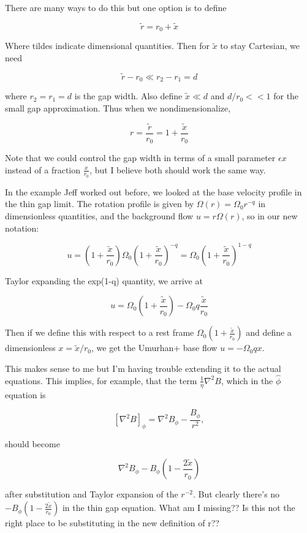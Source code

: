 \documentclass{paper}
\newcommand{\beq}{\begin{equation}}
\newcommand{\eeq}{\end{equation}}
\begin{document}
There are many ways to do this but one option is to define 

\beq
\widetilde{r} = r_0 + \widetilde{x}
\eeq 

Where tildes indicate dimensional quantities. Then for $\widetilde{x}$ to stay Cartesian, we need

\beq
\widetilde{r} - r_0 \ll r_2 - r_1 = d
\eeq

where $r_2 = r_1 = d$ is the gap width. Also define $\widetilde{x} \ll d$ and $d/r_0 << 1$ for the small gap approximation. Thus when we nondimensionalize,

\beq
r = \frac{\widetilde{r}}{r_0} = 1 + \frac{\widetilde{x}}{r_0}
\eeq

Note that we could control the gap width in terms of a small parameter $\epsilon x$ instead of a fraction $\frac{x}{r_0}$, but I believe both should work the same way.

In the example Jeff worked out before, we looked at the base velocity profile in the thin gap limit. The rotation profile is given by $\Omega(r) = \Omega_0 r^{-q}$ in dimensionless quantities, and the background flow $u = r\Omega(r)$, so in our new notation:

\beq
u = \left(1 + \frac{\widetilde{x}}{r_0}\right) \Omega_0 \left(1 + \frac{\widetilde{x}}{r_0}\right)^{-q} = \Omega_0 \left(1 + \frac{\widetilde{x}}{r_0}\right)^{1-q}  
\eeq

Taylor expanding the exp(1-q) quantity, we arrive at

\beq
u = \Omega_0 \left(1 + \frac{\widetilde{x}}{r_0}\right) - \Omega_0 q \frac{\widetilde{x}}{r_0}
\eeq

Then if we define this with respect to a rest frame $\Omega_0 \left(1 + \frac{\widetilde{x}}{r_0}\right)$ and define a dimensionless $x = \widetilde{x}/r_0$, we get the Umurhan+ base flow $u = - \Omega_0 q x$. 

This makes sense to me but I'm having trouble extending it to the actual equations. This implies, for example, that the term $\frac{1}{\eta} \nabla^2 B$, which in the $\hat{\phi}$ equation is

\beq
\left[\nabla^2 B\right]_\phi = \nabla^2 B_\phi - \frac{B_\phi}{r^2},
\eeq

should become 

\beq
\nabla^2 B_\phi - B_\phi \left(1 - \frac{2 \widetilde{x}}{r_0}\right)
\eeq

after substitution and Taylor expansion of the $r^{-2}$. But clearly there's no $- B_\phi \left(1 - \frac{2 \widetilde{x}}{r_0}\right)$ in the thin gap equation. What am I missing?? Is this not the right place to be substituting in the new definition of r??
\end{document}
